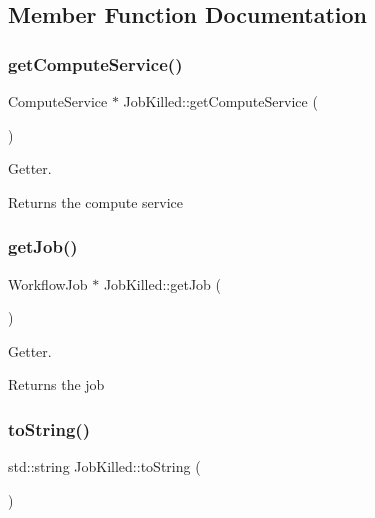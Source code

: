 \subsection{Member Function Documentation}
\mbox{\label{class_job_killed_ac0ffaa931ac5ad96fc312b96cdc0adf3}} 
\subsubsection{\texorpdfstring{get\+Compute\+Service()}{getComputeService()}}
{\footnotesize\ttfamily Compute\+Service $\ast$ Job\+Killed\+::get\+Compute\+Service (\begin{DoxyParamCaption}{ }\end{DoxyParamCaption})}



Getter. 

\begin{DoxyReturn}{Returns}
the compute service 
\end{DoxyReturn}
\mbox{\label{class_job_killed_a209244f2fcf845c2b5add291d74b83cf}} 
\subsubsection{\texorpdfstring{get\+Job()}{getJob()}}
{\footnotesize\ttfamily Workflow\+Job $\ast$ Job\+Killed\+::get\+Job (\begin{DoxyParamCaption}{ }\end{DoxyParamCaption})}



Getter. 

\begin{DoxyReturn}{Returns}
the job 
\end{DoxyReturn}
\mbox{\label{class_job_killed_a26c9c5f201637b2b0f39fee61426da77}} 
\subsubsection{\texorpdfstring{to\+String()}{toString()}}
{\footnotesize\ttfamily std\+::string Job\+Killed\+::to\+String (\begin{DoxyParamCaption}{ }\end{DoxyParamCaption})}



